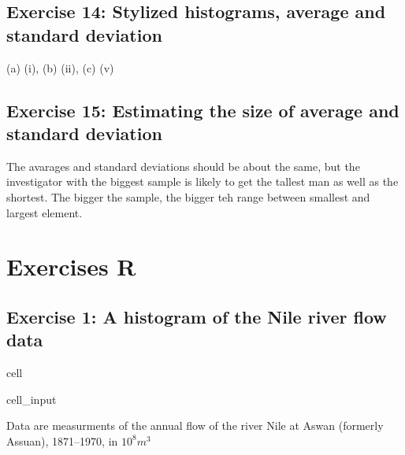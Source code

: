 \documentclass[letterpaper,10pt,english]{jupyterBook}
\begin{document}
\subsection{Exercise 14: Stylized histograms, average and standard deviation}
\label{\detokenize{exercises_unit_2:exercise-14-stylized-histograms-average-and-standard-deviation}}
\sphinxAtStartPar
(a) (i), (b) (ii), (c) (v)


\subsection{Exercise 15: Estimating the size of average and standard deviation}
\label{\detokenize{exercises_unit_2:exercise-15-estimating-the-size-of-average-and-standard-deviation}}
\sphinxAtStartPar
The avarages and standard deviations should be about the same, but the investigator with the biggest sample is likely to get the tallest man as well as the shortest. The bigger the sample, the bigger teh range between smallest and largest element.


\section{Exercises R}
\label{\detokenize{exercises_unit_2:exercises-r}}

\subsection{Exercise 1: A histogram of the Nile river flow data}
\label{\detokenize{exercises_unit_2:exercise-1-a-histogram-of-the-nile-river-flow-data}}
\begin{sphinxuseclass}{cell}\begin{sphinxVerbatimInput}

\begin{sphinxuseclass}{cell_input}
\begin{sphinxVerbatim}[commandchars=\\\{\}]
\end{sphinxVerbatim}

\end{sphinxuseclass}\end{sphinxVerbatimInput}

\end{sphinxuseclass}
\sphinxAtStartPar
Data are measurments of the annual flow of the river Nile at Aswan (formerly Assuan), 1871–1970, in \(10^8 m^3\)
\end{document}

